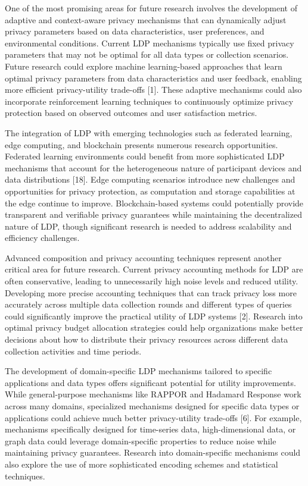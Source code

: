 \documentclass[conference]{IEEEtran}
\begin{document}
One of the most promising areas for future research involves the development of adaptive and context-aware privacy mechanisms that can dynamically adjust privacy parameters based on data characteristics, user preferences, and environmental conditions. Current LDP mechanisms typically use fixed privacy parameters that may not be optimal for all data types or collection scenarios. Future research could explore machine learning-based approaches that learn optimal privacy parameters from data characteristics and user feedback, enabling more efficient privacy-utility trade-offs [1]. These adaptive mechanisms could also incorporate reinforcement learning techniques to continuously optimize privacy protection based on observed outcomes and user satisfaction metrics.

The integration of LDP with emerging technologies such as federated learning, edge computing, and blockchain presents numerous research opportunities. Federated learning environments could benefit from more sophisticated LDP mechanisms that account for the heterogeneous nature of participant devices and data distributions [18]. Edge computing scenarios introduce new challenges and opportunities for privacy protection, as computation and storage capabilities at the edge continue to improve. Blockchain-based systems could potentially provide transparent and verifiable privacy guarantees while maintaining the decentralized nature of LDP, though significant research is needed to address scalability and efficiency challenges.

Advanced composition and privacy accounting techniques represent another critical area for future research. Current privacy accounting methods for LDP are often conservative, leading to unnecessarily high noise levels and reduced utility. Developing more precise accounting techniques that can track privacy loss more accurately across multiple data collection rounds and different types of queries could significantly improve the practical utility of LDP systems [2]. Research into optimal privacy budget allocation strategies could help organizations make better decisions about how to distribute their privacy resources across different data collection activities and time periods.

The development of domain-specific LDP mechanisms tailored to specific applications and data types offers significant potential for utility improvements. While general-purpose mechanisms like RAPPOR and Hadamard Response work across many domains, specialized mechanisms designed for specific data types or applications could achieve much better privacy-utility trade-offs [6]. For example, mechanisms specifically designed for time-series data, high-dimensional data, or graph data could leverage domain-specific properties to reduce noise while maintaining privacy guarantees. Research into domain-specific mechanisms could also explore the use of more sophisticated encoding schemes and statistical techniques.
\end{document}
